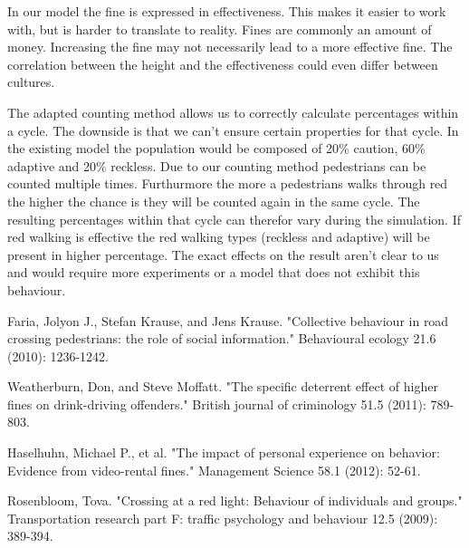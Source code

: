 \documentclass[a4paper]{article}
\begin{document}
In our model the fine is expressed in effectiveness. This makes it easier to work with, but is harder to translate to reality. Fines are commonly an amount of money. Increasing the fine may not necessarily lead to a more effective fine. The correlation between the height and the effectiveness could even differ between cultures.

The adapted counting method allows us to correctly calculate percentages within a cycle. The downside is that we can't ensure certain properties for that cycle. In the existing model the population would be composed of 20\% caution, 60\% adaptive and 20\% reckless. Due to our counting method pedestrians can be counted multiple times. Furthurmore the more a pedestrians walks through red the higher the chance is they will be counted again in the same cycle. The resulting percentages within that cycle can therefor vary during the simulation. If red walking is effective the red walking types (reckless and adaptive) will be present in higher percentage. The exact effects on the result aren't clear to us and would require more experiments or a model that does not exhibit this behaviour.

\clearpage

\begin{thebibliography}{3}

	 Faria, Jolyon J., Stefan Krause, and Jens Krause. "Collective behaviour in road crossing pedestrians: the role of social information." Behavioural ecology 21.6 (2010): 1236-1242.

	 Weatherburn, Don, and Steve Moffatt. "The specific deterrent effect of higher fines on drink-driving offenders." British journal of criminology 51.5 (2011): 789-803.
    
	 Haselhuhn, Michael P., et al. "The impact of personal experience on behavior: Evidence from video-rental fines." Management Science 58.1 (2012): 52-61.
    
	 Rosenbloom, Tova. "Crossing at a red light: Behaviour of individuals and groups." Transportation research part F: traffic psychology and behaviour 12.5 (2009): 389-394.
	
\end{thebibliography}
\end{document}
